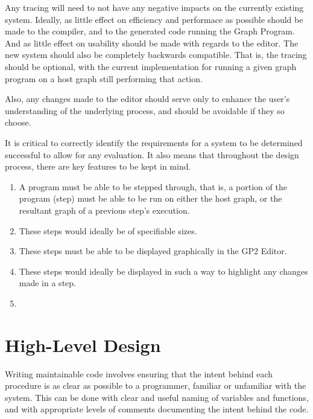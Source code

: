 \documentclass{UoYCSproject}
\begin{document}
Any tracing will need to not have any negative impacts on the currently existing system. Ideally, as little effect on efficiency and performace as possible should be made to the compiler, and to the generated code running the Graph Program. And as little effect on usability should be made with regards to the editor. The new system should also be completely backwards compatible. That is, the tracing should be optional, with the current implementation for running a given graph program on a host graph still performing that action.

Also, any changes made to the editor should serve only to enhance the user's understanding of the underlying process, and should be avoidable if they so choose.

It is critical to correctly identify the requirements for a system to be determined successful to allow for any evaluation. It also means that throughout the design process, there are key features to be kept in mind.
\begin{enumerate}
	\item A program must be able to be stepped through, that is, a portion of the program (step) must be able to be run on either the host graph, or the resultant graph of a previous step's execution.
	\item These steps would ideally be of specifiable sizes.
	\item These steps must be able to be displayed graphically in the GP2 Editor.
	\item These steps would ideally be displayed in such a way to highlight any changes made in a step.
	\item 
\end{enumerate}


\section{High-Level Design}
Writing maintainable code involves ensuring that the intent behind each procedure is as clear as possible to a programmer, familiar or unfamiliar with the system. This can be done with clear and useful naming of variables and functions, and with appropriate levels of comments documenting the intent behind the code.
\end{document}

